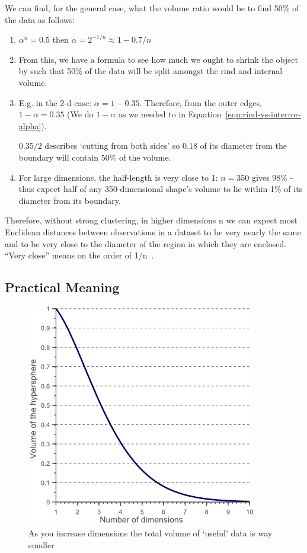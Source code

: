 \documentclass[11pt]{article}
\begin{document}
We can find, for the general case, what the volume ratio would be to find 50\% of the data as follows:

\begin{enumerate}
    \item $\alpha^n = 0.5$ then $\alpha = 2^{-1/n} \approx 1 - 0.7 / n$
    \item From this, we have a formula to see how much we ought to shrink the object by such that 50\% of the data will be split amongst the rind and internal volume.
    \item E.g. in the 2-d case: $\alpha = 1 - 0.35$. Therefore, from the outer edges, $1 - \alpha = 0.35$ (We do $1 - \alpha$ as we needed to in Equation~\ref{equ:rind-vs-interror-alpha}).

          $0.35/2$ describes `cutting from both sides' so 0.18 of its diameter from the boundary will contain 50\% of the volume.
    \item For large dimensions, the half-length is very close to 1: $n=350$ gives 98\% - thus expect half of any 350-dimensional shape's volume to lie within 1\% of its diameter from its boundary.
\end{enumerate}

Therefore, without strong clustering, in higher dimensions n we can expect most Euclidean distances between observations in a dataset to be very nearly the same and to be very close to the diameter of the region in which they are enclosed. ``Very close'' means on the order of 1/n~\cite{stackexchangeMathematicalDemonstration}.

\subsection{Practical Meaning}

\begin{figure}[H]
    \centering
    \includegraphics*[width=.4\linewidth]{figures/hypersphere.png}
    \caption{As you increase dimensions the total volume of `useful' data is way smaller}
\end{figure}
\end{document}
